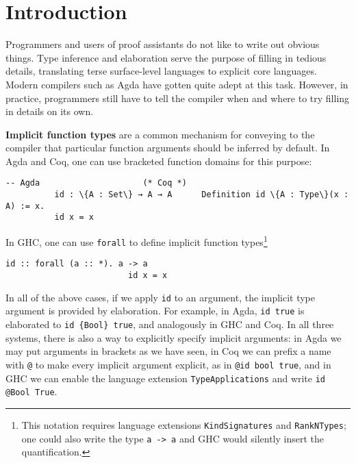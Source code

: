 \documentclass[acmsmall,review,anonymous,prologue,dvipsnames]{acmart}\settopmatter{printfolios=true,printccs=false,printacmref=false}
\begin{document}

\maketitle


\section{Introduction}

Programmers and users of proof assistants do not like to write out obvious
things. Type inference and elaboration serve the purpose of filling in tedious
details, translating terse surface-level languages to explicit core
languages. Modern compilers such as Agda have gotten quite adept at this
task. However, in practice, programmers still have to tell the compiler when and
where to try filling in details on its own.

\textbf{Implicit function types} are a common mechanism for conveying to the
compiler that particular function arguments should be inferred by default. In
Agda and Coq, one can use bracketed function domains for this purpose:
\begin{Verbatim}[commandchars=\\\{\}]
          -- Agda                     (* Coq *)
          id : \{A : Set\} → A → A      Definition id \{A : Type\}(x : A) := x.
          id x = x
\end{Verbatim}
In GHC, one can use \texttt{forall} to define implicit function
types\footnote{This notation requires language extensions
  \texttt{KindSignatures} and \texttt{RankNTypes}; one could also write the type
  \texttt{a -> a} and GHC would silently insert the quantification.}
\begin{Verbatim}[commandchars=\\\{\}]
                         id :: forall (a :: *). a -> a
                         id x = x
\end{Verbatim}

In all of the above cases, if we apply \texttt{id} to an argument, the implicit
type argument is provided by elaboration. For example, in Agda, \texttt{id true}
is elaborated to \texttt{id \{Bool\} true}, and analogously in GHC and Coq. In all
three systems, there is also a way to explicitly specify implicit arguments: in
Agda we may put arguments in brackets as we have seen, in Coq we can prefix a
name with \texttt{@} to make every implicit argument explicit, as in \texttt{@id
  bool true}, and in GHC we can enable the language extension
\texttt{TypeApplications} and write \texttt{id @Bool True}.
\end{document}
